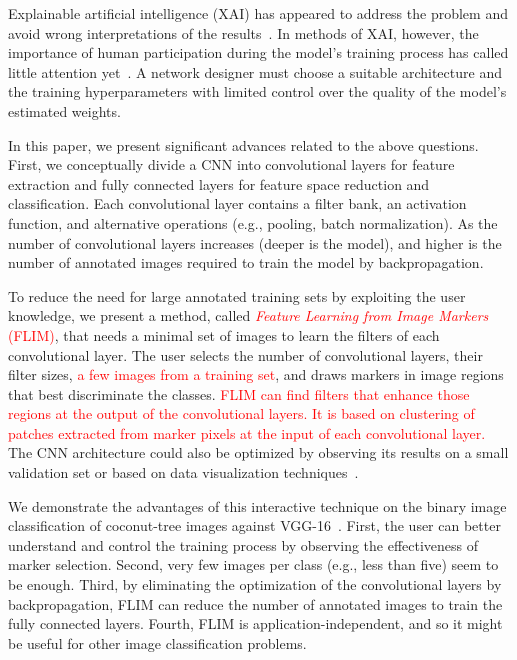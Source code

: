 \documentclass[journal, twoside]{IEEEtran}
\begin{document}
Explainable artificial intelligence (XAI) has appeared to address the problem and avoid wrong interpretations of the results~\cite{arrietaInfoFusion2020}. In methods of XAI, however, the importance of human participation during the model's training process has called little attention yet~\cite{AngelovNN2020}. A network designer must choose a suitable architecture and the training hyperparameters with limited control over the quality of the model's estimated weights.

In this paper, we present significant advances related to the above questions. First, we conceptually divide a CNN into convolutional layers for feature extraction and fully connected layers for feature space reduction and classification. Each convolutional layer contains a filter bank, an activation function, and alternative operations (e.g., pooling, batch normalization).  As the number of convolutional layers increases (deeper is the model), and higher is the number of annotated images required to train the model by backpropagation. 

To reduce the need for large annotated training sets by exploiting the user knowledge, we present a method, called \textcolor{red}{\emph{Feature Learning from Image Markers} (FLIM)}, that needs a minimal set of images to learn the filters of each convolutional layer. The user selects the number of convolutional layers, their filter sizes, \textcolor{red}{a few images from a training set}, and draws markers in image regions that best discriminate the classes. \textcolor{red}{FLIM can find filters that enhance those regions at the output of the convolutional layers. It is based on clustering of patches extracted from marker pixels at the input of each convolutional layer.} The CNN architecture could also be optimized by observing its results on a small validation set or based on data visualization techniques~\cite{rauber2016visualizing}.

We demonstrate the advantages of this interactive technique on the binary image classification of coconut-tree images against  VGG-16~\cite{simonyan2014very}. First, the user can better understand and control the training process by observing the effectiveness of marker selection.  Second, very few images per class (e.g., less than five) seem to be enough. Third, by eliminating the optimization of the convolutional layers by backpropagation, FLIM can reduce the number of annotated images to train the fully connected layers. Fourth, FLIM is application-independent, and so it might be useful for other image classification problems.
\end{document}

